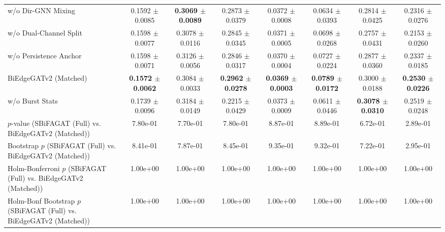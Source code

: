\begin{table}[t]
{\begin{tabular}{lccccccc}
w/o Dir-GNN Mixing & 0.1592 $\pm$ 0.0085 & \textbf{0.3069 $\pm$ 0.0089} & 0.2873 $\pm$ 0.0379 & 0.0372 $\pm$ 0.0008 & 0.0634 $\pm$ 0.0393 & 0.2814 $\pm$ 0.0425 & 0.2316 $\pm$ 0.0276 \\
w/o Dual-Channel Split & 0.1598 $\pm$ 0.0077 & 0.3078 $\pm$ 0.0116 & 0.2845 $\pm$ 0.0345 & 0.0371 $\pm$ 0.0005 & 0.0698 $\pm$ 0.0268 & 0.2757 $\pm$ 0.0431 & 0.2153 $\pm$ 0.0260 \\
w/o Persistence Anchor & 0.1598 $\pm$ 0.0071 & 0.3126 $\pm$ 0.0056 & 0.2846 $\pm$ 0.0317 & 0.0370 $\pm$ 0.0004 & 0.0727 $\pm$ 0.0224 & 0.2877 $\pm$ 0.0360 & 0.2337 $\pm$ 0.0185 \\
BiEdgeGATv2 (Matched) & \textbf{0.1572 $\pm$ 0.0062} & 0.3084 $\pm$ 0.0033 & \textbf{0.2962 $\pm$ 0.0278} & \textbf{0.0369 $\pm$ 0.0003} & \textbf{0.0789 $\pm$ 0.0172} & 0.3000 $\pm$ 0.0188 & \textbf{0.2530 $\pm$ 0.0226} \\
w/o Burst Stats & 0.1739 $\pm$ 0.0096 & 0.3184 $\pm$ 0.0149 & 0.2215 $\pm$ 0.0429 & 0.0373 $\pm$ 0.0009 & 0.0611 $\pm$ 0.0446 & \textbf{0.3078 $\pm$ 0.0310} & 0.2519 $\pm$ 0.0248 \\
\midrule
$p$-value (SBiFAGAT (Full) vs. BiEdgeGATv2 (Matched)) & 7.80e-01 & 7.70e-01 & 7.80e-01 & 8.87e-01 & 8.89e-01 & 6.72e-01 & 2.89e-01 \\
Bootstrap $p$ (SBiFAGAT (Full) vs. BiEdgeGATv2 (Matched)) & 8.41e-01 & 7.87e-01 & 8.45e-01 & 9.35e-01 & 9.32e-01 & 7.22e-01 & 2.95e-01 \\
Holm-Bonferroni $p$ (SBiFAGAT (Full) vs. BiEdgeGATv2 (Matched)) & 1.00e+00 & 1.00e+00 & 1.00e+00 & 1.00e+00 & 1.00e+00 & 1.00e+00 & 1.00e+00 \\
Holm-Bonf Bootstrap $p$ (SBiFAGAT (Full) vs. BiEdgeGATv2 (Matched)) & 1.00e+00 & 1.00e+00 & 1.00e+00 & 1.00e+00 & 1.00e+00 & 1.00e+00 & 1.00e+00 \\
\bottomrule
\end{tabular}
}
\end{table}

